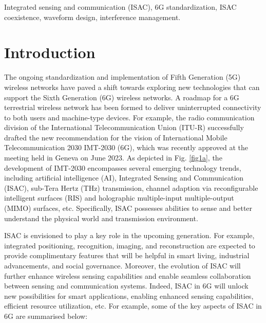 \documentclass[journal, comsoc]{IEEEtran}
\begin{document}
 \begin{IEEEkeywords}
Integrated sensing and communication (ISAC), 6G standardization, ISAC coexistence, waveform design, interference management.
 \end{IEEEkeywords}

\IEEEpeerreviewmaketitle

\vspace{-3mm}

\section{Introduction}
\label{sec:1}


The ongoing standardization and implementation of Fifth Generation (5G) wireless networks have paved a shift towards exploring new technologies that can support the Sixth Generation (6G) wireless networks. A roadmap for a 6G terrestrial wireless network has been formed to deliver uninterrupted connectivity to both users and machine-type devices. For example, the radio communication division of the International Telecommunication Union (ITU-R) successfully drafted the new recommendation for the vision of International Mobile Telecommunication 2030 IMT-2030 (6G), which was recently approved at the meeting held in Geneva on June 2023.  As depicted in Fig. \ref{fig1a}, the development of IMT-2030 encompasses several emerging technology trends, including artificial intelligence (AI), Integrated Sensing and Communication (ISAC), sub-Tera Hertz (THz) transmission, channel adaption via reconfigurable intelligent surfaces (RIS) and holographic multiple-input multiple-output (MIMO) surfaces, etc. Specifically, ISAC possesses abilities to sense and better understand the physical world and transmission environment. 

ISAC is envisioned to play a key role in the upcoming generation. For example, integrated positioning, recognition, imaging, and reconstruction are expected to provide complimentary features that will be helpful in smart living, industrial advancements, and social governance. Moreover, the evolution of ISAC will further enhance wireless sensing capabilities and enable seamless collaboration between sensing and communication systems. Indeed, ISAC in 6G will unlock new possibilities for smart applications, enabling enhanced sensing capabilities, efficient resource utilization, etc. For example, some of the key aspects of ISAC in 6G are summarised below: 
\end{document}
